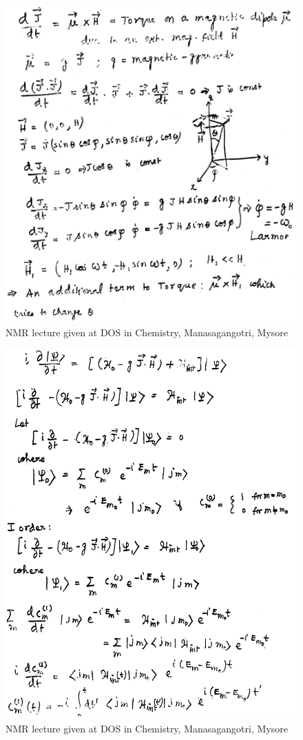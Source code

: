 \begin{figure}[H]
\centering
\includegraphics[scale=0.48]{src/images/chap8/3.eps}
\caption{NMR lecture given at DOS in Chemistry, Manasagangotri, Mysore}
\end{figure}
\begin{figure}[H]
\centering
\includegraphics[scale=0.48]{src/images/chap8/4.eps}
\caption{NMR lecture given at DOS in Chemistry, Manasagangotri, Mysore}
\end{figure}
